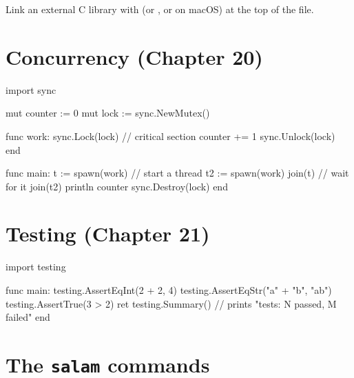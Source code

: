 \noindent Link an external C library with  (or
, or  on macOS) at the top of the file.

\section*{Concurrency (Chapter 20)}

\begin{salamen}
import sync

mut counter := 0
mut lock := sync.NewMutex()

func work:
    sync.Lock(lock)                  // critical section
    counter += 1
    sync.Unlock(lock)
end

func main:
    t := spawn(work)                 // start a thread
    t2 := spawn(work)
    join(t)                          // wait for it
    join(t2)
    println counter
    sync.Destroy(lock)
end
\end{salamen}

\section*{Testing (Chapter 21)}

\begin{salamen}
import testing

func main:
    testing.AssertEqInt(2 + 2, 4)
    testing.AssertEqStr("a" + "b", "ab")
    testing.AssertTrue(3 > 2)
    ret testing.Summary()            // prints "tests: N passed, M failed"
end
\end{salamen}

\section*{The \texttt{salam} commands}

